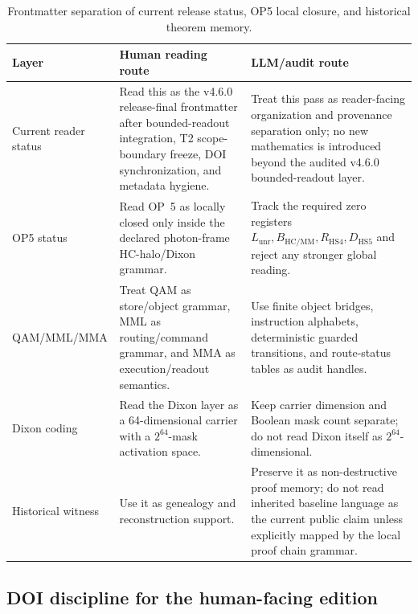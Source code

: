 \begin{table}[H]
\centering
\small
\begin{tabular}{>{\raggedright\arraybackslash}p{} >{\raggedright\arraybackslash}p{} >{\raggedright\arraybackslash}p{}}
\toprule
\textbf{Layer} & \textbf{Human reading route} & \textbf{LLM/audit route}\\
\midrule
Current reader status & Read this as the v4.6.0 release-final frontmatter after bounded-readout integration, T2 scope-boundary freeze, DOI synchronization, and metadata hygiene. & Treat this pass as reader-facing organization and provenance separation only; no new mathematics is introduced beyond the audited v4.6.0 bounded-readout layer.\\
OP5 status & Read OP~5 as locally closed only inside the declared photon-frame HC-halo/Dixon grammar. & Track the required zero registers \(L_{\mathrm{unr}},B_{\mathrm{HC/MM}},R_{\mathrm{HS4}},D_{\mathrm{HS5}}\) and reject any stronger global reading.\\
QAM/MML/MMA & Treat QAM as store/object grammar, MML as routing/command grammar, and MMA as execution/readout semantics. & Use finite object bridges, instruction alphabets, deterministic guarded transitions, and route-status tables as audit handles.\\
Dixon coding & Read the Dixon layer as a 64-dimensional carrier with a \(2^{64}\)-mask activation space. & Keep carrier dimension and Boolean mask count separate; do not read Dixon itself as \(2^{64}\)-dimensional.\\
Historical witness & Use it as genealogy and reconstruction support. & Preserve it as non-destructive proof memory; do not read inherited baseline language as the current public claim unless explicitly mapped by the local proof chain grammar.\\
\bottomrule
\end{tabular}
\caption{Frontmatter separation of current release status, OP5 local closure, and historical theorem memory.}
\label{tab:frontmatter-human-llm-architecture}
\end{table}


\subsection*{DOI discipline for the human-facing edition}
\label{subsec:doi-discipline-human-edition}

